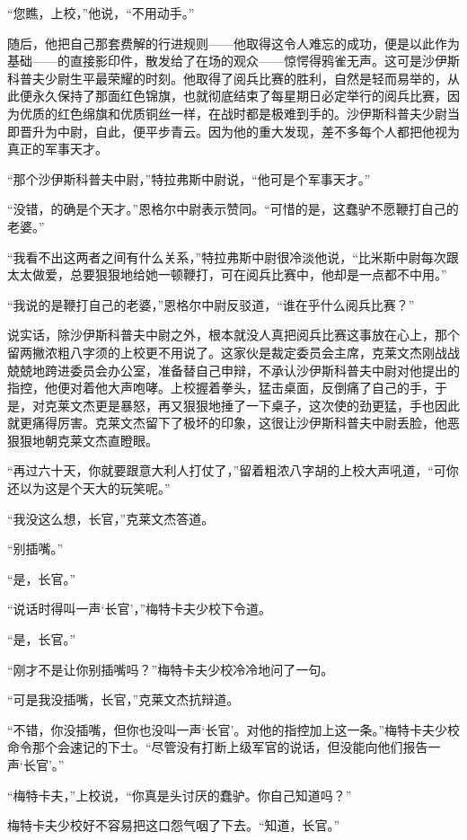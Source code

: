     “您瞧，上校，”他说，“不用动手。”

    随后，他把自己那套费解的行进规则——他取得这令人难忘的成功，便是以此作为基础——的直接影印件，散发给了在场的观众——惊愕得鸦雀无声。这可是沙伊斯科普夫少尉生平最荣耀的时刻。他取得了阅兵比赛的胜利，自然是轻而易举的，从此便永久保持了那面红色锦旗，也就彻底结束了每星期日必定举行的阅兵比赛，因为优质的红色绵旗和优质铜丝一样，在战时都是极难到手的。沙伊斯科普夫少尉当即晋升为中尉，自此，便平步青云。因为他的重大发现，差不多每个人都把他视为真正的军事天才。

    “那个沙伊斯科普夫中尉，”特拉弗斯中尉说，“他可是个军事天才。”

    “没错，的确是个天才。”恩格尔中尉表示赞同。“可惜的是，这蠢驴不愿鞭打自己的老婆。”

    “我看不出这两者之间有什么关系，”特拉弗斯中尉很冷淡他说，“比米斯中尉每次跟太太做爱，总要狠狠地给她一顿鞭打，可在阅兵比赛中，他却是一点都不中用。”

    “我说的是鞭打自己的老婆，”恩格尔中尉反驳道，“谁在乎什么阅兵比赛？”

    说实话，除沙伊斯科普夫中尉之外，根本就没人真把阅兵比赛这事放在心上，那个留两撇浓粗八字须的上校更不用说了。这家伙是裁定委员会主席，克莱文杰刚战战兢兢地跨进委员会办公室，准备替自己申辩，不承认沙伊斯科普夫中尉对他提出的指控，他便对着他大声咆哮。上校握着拳头，猛击桌面，反倒痛了自己的手，于是，对克莱文杰更是暴怒，再又狠狠地捶了一下桌子，这次使的劲更猛，手也因此就更痛得厉害。克莱文杰留下了极坏的印象，这很让沙伊斯科普夫中尉丢脸，他恶狠狠地朝克莱文杰直瞪眼。

    “再过六十天，你就要跟意大利人打仗了，”留着粗浓八字胡的上校大声吼道，“可你还以为这是个天大的玩笑呢。”

    “我没这么想，长官，”克莱文杰答道。

    “别插嘴。”

    “是，长官。”

    “说话时得叫一声‘长官’，”梅特卡夫少校下令道。

    “是，长官。”

    “刚才不是让你别插嘴吗？”梅特卡夫少校冷冷地问了一句。

    “可是我没插嘴，长官，”克莱文杰抗辩道。

    “不错，你没插嘴，但你也没叫一声‘长官’。对他的指控加上这一条。”梅特卡夫少校命令那个会速记的下士。“尽管没有打断上级军官的说话，但没能向他们报告一声‘长官’。”

    “梅特卡夫，”上校说，“你真是头讨厌的蠢驴。你自己知道吗？”

    梅特卡夫少校好不容易把这口怨气咽了下去。“知道，长官。”

